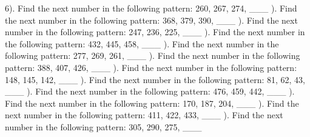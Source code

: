 \documentclass{article}%
\begin{document}
6). Find the next number in the following pattern: 260, 267, 274, \_\_\_%
\newline%
\newline%
). Find the next number in the following pattern: 368, 379, 390, \_\_\_%
\newline%
\newline%
). Find the next number in the following pattern: 247, 236, 225, \_\_\_%
\newline%
\newline%
). Find the next number in the following pattern: 432, 445, 458, \_\_\_%
\newline%
\newline%
). Find the next number in the following pattern: 277, 269, 261, \_\_\_%
\newline%
\newline%
). Find the next number in the following pattern: 388, 407, 426, \_\_\_%
\newline%
\newline%
). Find the next number in the following pattern: 148, 145, 142, \_\_\_%
\newline%
\newline%
). Find the next number in the following pattern: 81, 62, 43, \_\_\_%
\newline%
\newline%
). Find the next number in the following pattern: 476, 459, 442, \_\_\_%
\newline%
\newline%
). Find the next number in the following pattern: 170, 187, 204, \_\_\_%
\newline%
\newline%
). Find the next number in the following pattern: 411, 422, 433, \_\_\_%
\newline%
\newline%
). Find the next number in the following pattern: 305, 290, 275, \_\_\_%
\newline%
\newline%
\end{document}
